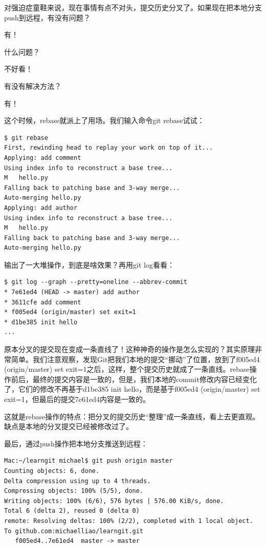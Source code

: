 对强迫症童鞋来说，现在事情有点不对头，提交历史分叉了。如果现在把本地分支push到远程，有没有问题？

有！

什么问题？

不好看！

有没有解决方法？

有！

这个时候，rebase就派上了用场。我们输入命令git rebase试试：

\begin{verbatim}
$ git rebase
First, rewinding head to replay your work on top of it...
Applying: add comment
Using index info to reconstruct a base tree...
M	hello.py
Falling back to patching base and 3-way merge...
Auto-merging hello.py
Applying: add author
Using index info to reconstruct a base tree...
M	hello.py
Falling back to patching base and 3-way merge...
Auto-merging hello.py
\end{verbatim}

输出了一大堆操作，到底是啥效果？再用git log看看：

\begin{verbatim}
$ git log --graph --pretty=oneline --abbrev-commit
* 7e61ed4 (HEAD -> master) add author
* 3611cfe add comment
* f005ed4 (origin/master) set exit=1
* d1be385 init hello
...
\end{verbatim}

原本分叉的提交现在变成一条直线了！这种神奇的操作是怎么实现的？其实原理非常简单。我们注意观察，发现Git把我们本地的提交“挪动”了位置，放到了f005ed4 (origin/master) set exit=1之后，这样，整个提交历史就成了一条直线。rebase操作前后，最终的提交内容是一致的，但是，我们本地的commit修改内容已经变化了，它们的修改不再基于d1be385 init hello，而是基于f005ed4 (origin/master) set exit=1，但最后的提交7e61ed4内容是一致的。

这就是rebase操作的特点：把分叉的提交历史“整理”成一条直线，看上去更直观。缺点是本地的分叉提交已经被修改过了。

最后，通过push操作把本地分支推送到远程：

\begin{verbatim}
Mac:~/learngit michael$ git push origin master
Counting objects: 6, done.
Delta compression using up to 4 threads.
Compressing objects: 100% (5/5), done.
Writing objects: 100% (6/6), 576 bytes | 576.00 KiB/s, done.
Total 6 (delta 2), reused 0 (delta 0)
remote: Resolving deltas: 100% (2/2), completed with 1 local object.
To github.com:michaelliao/learngit.git
   f005ed4..7e61ed4  master -> master
\end{verbatim}

